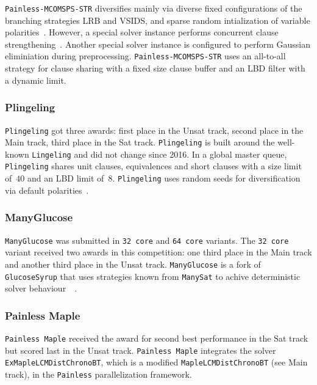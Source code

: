 \documentclass{elsarticle}
\newcommand{\solver}[1]{\texttt{#1}}
\begin{document}
\solver{Painless-MCOMSPS-STR} diversifies mainly via diverse fixed configurations of the branching strategies LRB and VSIDS, and sparse random intialization of variable polarities~\cite{Balyo:2015:Hordesat}. 
However, a special solver instance performs concurrent clause strengthening~\cite{Wieringa:2013:CCS}. 
Another special solver instance is configured to perform Gaussian eliminiation during preprocessing. 
\solver{Painless-MCOMSPS-STR} uses an all-to-all strategy for clause sharing with a fixed size clause buffer and an LBD filter with a dynamic limit. 


\subsubsection{Plingeling} 

\solver{Plingeling} got three awards: first place in the Unsat track, second place in the Main track, third place in the Sat track. 
\solver{Plingeling} is built around the well-known \solver{Lingeling} and did not change since 2016. 
In a global master queue, \solver{Plingeling} shares unit clauses, equivalences and short clauses with a size limit of~$40$ and an LBD limit of~$8$. 
\solver{Plingeling} uses random seeds for diversification via default polarities~\cite{Biere:SC2020,Biere:2012:Lingeling}. 


\subsubsection{ManyGlucose}

\solver{ManyGlucose} was submitted in \solver{32 core} and \solver{64 core} variants. 
The \solver{32 core} variant received two awards in this competition: one third place in the Main track and another third place in the Unsat track. 
\solver{ManyGlucose} is a fork of \solver{GlucoseSyrup} that uses strategies known from \solver{ManySat} to achive deterministic solver behaviour~\cite{GlucoseSyrup}~\cite{ManySat}. 


\subsubsection{Painless Maple} 

\solver{Painless Maple} received the award for second best performance in the Sat track but scored last in the Unsat track. 
\solver{Painless Maple} integrates the solver \solver{ExMapleLCMDistChronoBT}, which is a modified \solver{MapleLCMDistChronoBT} (see Main track), in the \solver{Painless} parallelization framework. 
\end{document}
